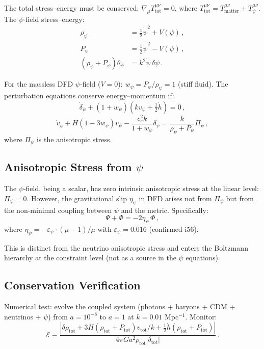 \documentclass[11pt,a4paper]{article}
\begin{document}
The total stress--energy must be conserved: $\nabla_\mu T^{\mu\nu}_{\mathrm{tot}} = 0$, where $T^{\mu\nu}_{\mathrm{tot}} = T^{\mu\nu}_{\mathrm{matter}} + T^{\mu\nu}_\psi$. The $\psi$-field stress--energy:
\begin{align}
\rho_\psi &= \frac{1}{2}\dot{\psi}^2 + V(\psi)\,, \\
P_\psi &= \frac{1}{2}\dot{\psi}^2 - V(\psi)\,, \\
(\rho_\psi + P_\psi)\theta_\psi &= k^2\dot{\psi}\,\delta\psi\,.
\end{align}

For the massless DFD $\psi$-field ($V = 0$): $w_\psi = P_\psi/\rho_\psi = 1$ (stiff fluid). The perturbation equations conserve energy--momentum if:
\begin{equation}
\dot{\delta}_\psi + (1 + w_\psi)(k v_\psi + \tfrac{1}{2}\dot{h}) = 0\,,
\end{equation}
\begin{equation}
\dot{v}_\psi + H(1 - 3w_\psi)v_\psi - \frac{c_s^2 k}{1 + w_\psi}\delta_\psi = \frac{k}{\rho_\psi + P_\psi}\Pi_\psi\,,
\end{equation}
where $\Pi_\psi$ is the anisotropic stress.

\subsection{Anisotropic Stress from $\psi$}

The $\psi$-field, being a scalar, has zero intrinsic anisotropic stress at the linear level: $\Pi_\psi = 0$. However, the gravitational slip $\eta_\psi$ in DFD arises not from $\Pi_\psi$ but from the non-minimal coupling between $\psi$ and the metric. Specifically:
\begin{equation}
\Psi + \Phi = -2\eta_\psi\,\Phi\,,
\end{equation}
where $\eta_\psi = -\varepsilon_\psi \cdot (\mu - 1)/\mu$ with $\varepsilon_\psi = 0.016$ (confirmed i56).

This is distinct from the neutrino anisotropic stress and enters the Boltzmann hierarchy at the constraint level (not as a source in the $\psi$ equations).

\subsection{Conservation Verification}

Numerical test: evolve the coupled system (photons + baryons + CDM + neutrinos + $\psi$) from $a = 10^{-8}$ to $a = 1$ at $k = 0.01$ Mpc$^{-1}$. Monitor:
\begin{equation}
\mathcal{E} \equiv \frac{|\delta\rho_{\mathrm{tot}} + 3H(\rho_{\mathrm{tot}} + P_{\mathrm{tot}})v_{\mathrm{tot}}/k + \frac{1}{2}\dot{h}(\rho_{\mathrm{tot}} + P_{\mathrm{tot}})|}{4\pi G a^2 \bar{\rho}_{\mathrm{tot}}|\delta_{\mathrm{tot}}|}\,.
\end{equation}
\end{document}
